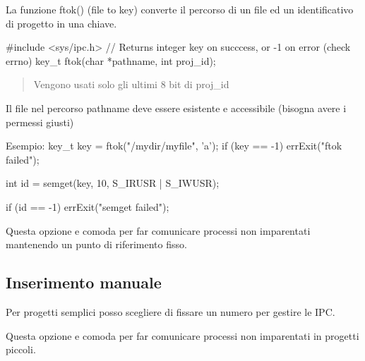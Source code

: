 La funzione {\ttfamily ftok()} (file to key) converte il percorso di un file ed un identificativo di progetto in una chiave.


\begin{DoxyCode}
\textcolor{preprocessor}{#include <sys/ipc.h>}
\textcolor{comment}{// Returns integer key on succcess, or -1 on error (check errno)}
key\_t ftok(\textcolor{keywordtype}{char} *pathname, \textcolor{keywordtype}{int} proj\_id);
\end{DoxyCode}
 \begin{quote}
Vengono usati solo gli ultimi 8 bit di proj\+\_\+id \end{quote}


Il file nel percorso pathname deve essere esistente e accessibile (bisogna avere i permessi giusti)


\begin{DoxyCode}
Esempio:
key\_t key = ftok(\textcolor{stringliteral}{"/mydir/myfile"}, \textcolor{charliteral}{'a'});
\textcolor{keywordflow}{if} (key == -1)
    errExit(\textcolor{stringliteral}{"ftok failed"});

\textcolor{keywordtype}{int} \textcolor{keywordtype}{id} = semget(key, 10, S\_IRUSR | S\_IWUSR);

\textcolor{keywordflow}{if} (\textcolor{keywordtype}{id} == -1)
    errExit(\textcolor{stringliteral}{"semget failed"});
\end{DoxyCode}


Questa opzione e\textquotesingle{} comoda per far comunicare processi non imparentati mantenendo un punto di riferimento fisso.

\subsection*{Inserimento manuale}

Per progetti semplici posso scegliere di fissare un numero per gestire le I\+PC.

Questa opzione e\textquotesingle{} comoda per far comunicare processi non imparentati in progetti piccoli. 